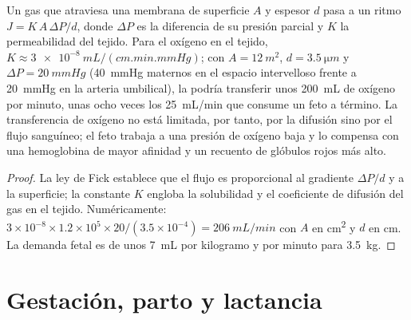 \begin{theorem}\label{thm:b2:mammal-reproduction:fick}
Un gas que atraviesa una membrana de superficie $A$ y espesor $d$ pasa a
un ritmo $J = K\,A\,\Delta P/d$, donde $\Delta P$ es la diferencia de su
presión parcial y $K$ la permeabilidad del tejido. Para el oxígeno
en el tejido, $K \approx \qty{3e-8}{mL/(cm.min.mmHg)}$; con $A =
\qty{12}{m^2}$, $d = \qty{3.5}{\micro m}$ y $\Delta P =
\qty{20}{mmHg}$ (\qty{40}{mmHg} maternos en el espacio intervelloso
frente a \qty{20}{mmHg} en la arteria umbilical), la  podría
transferir unos \qty{200}{mL} de oxígeno por minuto, unas ocho veces los
\qty{25}{mL/min} que consume un feto a término. La transferencia de
oxígeno no está limitada, por tanto, por la difusión sino por el flujo
sanguíneo; el feto trabaja a una presión de oxígeno baja y lo compensa
con una hemoglobina de mayor afinidad y un recuento de glóbulos rojos más
alto.
\end{theorem}
\begin{proof}
La ley de Fick establece que el flujo es proporcional al gradiente
$\Delta P/d$ y a la superficie; la constante $K$ engloba la solubilidad y
el coeficiente de difusión del gas en el tejido. Numéricamente:
$3\times 10^{-8}\times 1.2\times 10^{5}\times 20/(3.5\times 10^{-4})
= \qty{206}{mL/min}$ con $A$ en \unit{cm^2} y $d$ en \unit{cm}.
La demanda fetal es de unos \qty{7}{mL} por kilogramo y por minuto para
\qty{3.5}{kg}.
\end{proof}

\section{Gestación, parto y lactancia}


